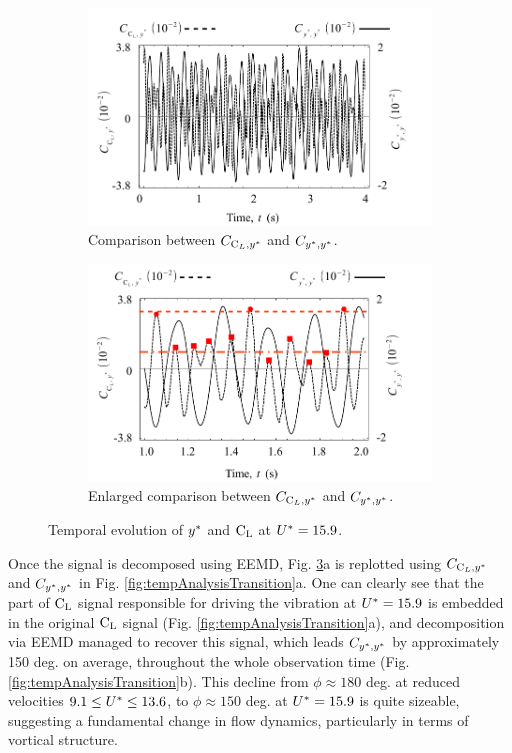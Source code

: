 \documentclass[oneside]{utmthesis}
\begin{document}
\begin{figure}[H]
  \centering
  \begin{subfigure}[h]{0.7\textwidth}
    \includegraphics[width=\textwidth]{figs/tempEvoCompare-a}
    \caption{Comparison between $C_{\text{C}_{L},y^{*}}$ and $C_{y^{*},y^{*}}$.}
    \label{fig:tempEvoCompare-a}
  \end{subfigure}

  \begin{subfigure}[h]{0.7\textwidth}
    \includegraphics[width=\textwidth]{figs/tempEvoCompare-b}
    \caption{Enlarged comparison between $C_{\text{C}_{L},y^{*}}$ and $C_{y^{*},y^{*}}$.}
    \label{fig:tempEvoCompare-b}
  \end{subfigure}
  \caption{Temporal evolution of $y^{*}$ and $\text{C}_{\text{L}}$ at $U^{*} = 15.9$.} \label{fig:tempEvoCompare}
\end{figure}

Once the signal is decomposed using EEMD, Fig. \ref{fig:tempEvoCompare}a is replotted using $C_{\text{C}_{L},y^{*}}$ and $C_{y^{*},y^{*}}$ in Fig. \ref{fig:tempAnalysisTransition}a. One can clearly see that the part of $\text{C}_{\text{L}}$ signal responsible for driving the vibration at  $U^{*} = 15.9$ is embedded in the original $\text{C}_{\text{L}}$ signal (Fig. \ref{fig:tempAnalysisTransition}a), and decomposition via EEMD managed to recover this signal, which leads $C_{y^{*},y^{*}}$ by approximately 150 deg. on average, throughout the whole observation time (Fig. \ref{fig:tempAnalysisTransition}b). This decline from $\phi \approx 180$ deg. at reduced velocities $9.1 \leq U^{*} \leq 13.6$, to $\phi \approx 150$ deg. at $U^{*} = 15.9$ is quite sizeable, suggesting a fundamental change in flow dynamics, particularly in terms of vortical structure.
\end{document}

